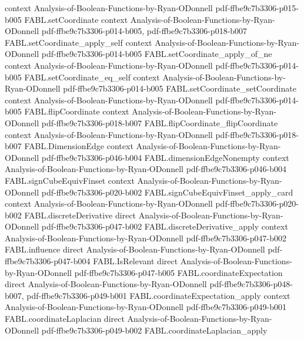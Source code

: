 \begin{theorem}
  {context}
  {Analysis-of-Boolean-Functions-by-Ryan-ODonnell}
  {pdf-ffbe9c7b3306-p015-b005}
\proofstep
  {FABL.setCoordinate}
  {context}
  {Analysis-of-Boolean-Functions-by-Ryan-ODonnell}
  {pdf-ffbe9c7b3306-p014-b005,
    pdf-ffbe9c7b3306-p018-b007}
\proofstep
  {FABL.setCoordinate_apply_self}
  {context}
  {Analysis-of-Boolean-Functions-by-Ryan-ODonnell}
  {pdf-ffbe9c7b3306-p014-b005}
\proofstep
  {FABL.setCoordinate_apply_of_ne}
  {context}
  {Analysis-of-Boolean-Functions-by-Ryan-ODonnell}
  {pdf-ffbe9c7b3306-p014-b005}
\proofstep
  {FABL.setCoordinate_eq_self}
  {context}
  {Analysis-of-Boolean-Functions-by-Ryan-ODonnell}
  {pdf-ffbe9c7b3306-p014-b005}
\proofstep
  {FABL.setCoordinate_setCoordinate}
  {context}
  {Analysis-of-Boolean-Functions-by-Ryan-ODonnell}
  {pdf-ffbe9c7b3306-p014-b005}
\proofstep
  {FABL.flipCoordinate}
  {context}
  {Analysis-of-Boolean-Functions-by-Ryan-ODonnell}
  {pdf-ffbe9c7b3306-p018-b007}
\proofstep
  {FABL.flipCoordinate_flipCoordinate}
  {context}
  {Analysis-of-Boolean-Functions-by-Ryan-ODonnell}
  {pdf-ffbe9c7b3306-p018-b007}
\proofstep
  {FABL.DimensionEdge}
  {context}
  {Analysis-of-Boolean-Functions-by-Ryan-ODonnell}
  {pdf-ffbe9c7b3306-p046-b004}
\proofstep
  {FABL.dimensionEdgeNonempty}
  {context}
  {Analysis-of-Boolean-Functions-by-Ryan-ODonnell}
  {pdf-ffbe9c7b3306-p046-b004}
\proofstep
  {FABL.signCubeEquivFinset}
  {context}
  {Analysis-of-Boolean-Functions-by-Ryan-ODonnell}
  {pdf-ffbe9c7b3306-p020-b002}
\proofstep
  {FABL.signCubeEquivFinset_apply_card}
  {context}
  {Analysis-of-Boolean-Functions-by-Ryan-ODonnell}
  {pdf-ffbe9c7b3306-p020-b002}
\proofstep
  {FABL.discreteDerivative}
  {direct}
  {Analysis-of-Boolean-Functions-by-Ryan-ODonnell}
  {pdf-ffbe9c7b3306-p047-b002}
\proofstep
  {FABL.discreteDerivative_apply}
  {context}
  {Analysis-of-Boolean-Functions-by-Ryan-ODonnell}
  {pdf-ffbe9c7b3306-p047-b002}
\proofstep
  {FABL.influence}
  {direct}
  {Analysis-of-Boolean-Functions-by-Ryan-ODonnell}
  {pdf-ffbe9c7b3306-p047-b004}
\proofstep
  {FABL.IsRelevant}
  {direct}
  {Analysis-of-Boolean-Functions-by-Ryan-ODonnell}
  {pdf-ffbe9c7b3306-p047-b005}
\proofstep
  {FABL.coordinateExpectation}
  {direct}
  {Analysis-of-Boolean-Functions-by-Ryan-ODonnell}
  {pdf-ffbe9c7b3306-p048-b007,
    pdf-ffbe9c7b3306-p049-b001}
\proofstep
  {FABL.coordinateExpectation_apply}
  {context}
  {Analysis-of-Boolean-Functions-by-Ryan-ODonnell}
  {pdf-ffbe9c7b3306-p049-b001}
\proofstep
  {FABL.coordinateLaplacian}
  {direct}
  {Analysis-of-Boolean-Functions-by-Ryan-ODonnell}
  {pdf-ffbe9c7b3306-p049-b002}
\proofstep
  {FABL.coordinateLaplacian_apply}

\end{theorem}
